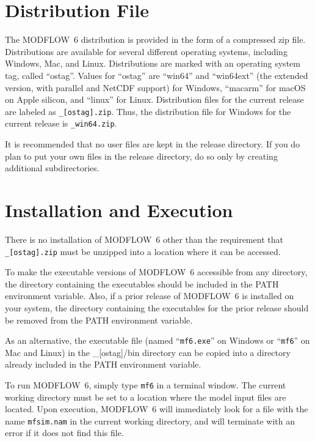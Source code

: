 \documentclass[11pt,twoside,twocolumn]{usgsreport}
\begin{document}
\section{Distribution File}
The MODFLOW~6 distribution is provided in the form of a compressed zip file.  Distributions are available for several different operating systems, including Windows, Mac, and Linux.  Distributions are marked with an operating system tag, called ``ostag''.  Values for ``ostag'' are ``win64'' and ``win64ext'' (the extended version, with parallel and NetCDF support) for Windows, ``macarm'' for macOS on Apple silicon, and ``linux'' for Linux.  Distribution files for the current release are labeled as \texttt{\modflowversion\_[ostag].zip}.  Thus, the distribution file for Windows for the current release is \texttt{\modflowversion\_win64.zip}.

It is recommended that no user files are kept in the release directory.  If you do plan to put your own files in the release directory, do so only by creating additional subdirectories.

\section{Installation and Execution}
There is no installation of MODFLOW~6 other than the requirement that \texttt{\modflowversion\_[ostag].zip} must be unzipped into a location where it can be accessed.  

To make the executable versions of MODFLOW~6 accessible from any directory, the directory containing the executables should be included in the PATH environment variable.  Also, if a prior release of MODFLOW~6 is installed on your system, the directory containing the executables for the prior release should be removed from the PATH environment variable.

As an alternative, the executable file (named ``\texttt{mf6.exe}'' on Windows or ``\texttt{mf6}'' on Mac and Linux) in the \modflowversion\_[ostag]/bin directory can be copied into a directory already included in the PATH environment variable.

To run MODFLOW~6, simply type \texttt{mf6} in a terminal window.  The current working directory must be set to a location where the model input files are located.  Upon execution, MODFLOW~6 will immediately look for a file with the name \texttt{mfsim.nam} in the current working directory, and will terminate with an error if it does not find this file.
\end{document}
